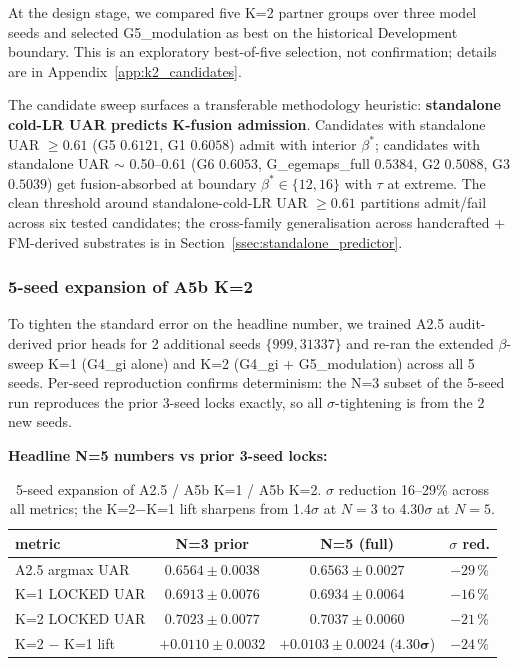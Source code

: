 At the design stage, we compared five K=2 partner groups over three model seeds and selected G5\_modulation as best on the historical Development boundary. This is an exploratory best-of-five selection, not confirmation; details are in Appendix~\ref{app:k2_candidates}.

The candidate sweep surfaces a transferable methodology heuristic: \textbf{standalone cold-LR UAR predicts K-fusion admission}. Candidates with standalone UAR $\geq 0.61$ (G5 $0.6121$, G1 $0.6058$) admit with interior $\beta^*$; candidates with standalone UAR $\sim$ 0.50--0.61 (G6 $0.6053$, G\_egemaps\_full $0.5384$, G2 $0.5088$, G3 $0.5039$) get fusion-absorbed at boundary $\beta^* \in \{12, 16\}$ with $\tau$ at extreme. The clean threshold around standalone-cold-LR UAR $\geq 0.61$ partitions admit/fail across six tested candidates; the cross-family generalisation across handcrafted + FM-derived substrates is in Section~\ref{ssec:standalone_predictor}.

\subsubsection{5-seed expansion of A5b K=2}
\label{ssec:k2_5seed}

To tighten the standard error on the headline number, we trained A2.5 audit-derived prior heads for 2 additional seeds $\{999, 31337\}$ and re-ran the extended $\beta$-sweep K=1 (G4\_gi alone) and K=2 (G4\_gi + G5\_modulation) across all 5 seeds. Per-seed reproduction confirms determinism: the N=3 subset of the 5-seed run reproduces the prior 3-seed locks exactly, so all $\sigma$-tightening is from the 2 new seeds.

\textbf{Headline N=5 numbers vs prior 3-seed locks:}

\begin{table}[t]
\centering\small
\caption{5-seed expansion of A2.5 / A5b K=1 / A5b K=2. $\sigma$ reduction 16--29\% across all metrics; the K=2$-$K=1 lift sharpens from 1.4$\sigma$ at $N{=}3$ to 4.30$\sigma$ at $N{=}5$.}
\label{tab:5seed}
\begin{tabular}{lccc}
\toprule
metric              & N=3 prior        & N=5 (full)        & $\sigma$ red. \\
\midrule
A2.5 argmax UAR     & $0.6564 \pm 0.0038$ & $0.6563 \pm 0.0027$ & $-29\,\%$ \\
K=1 LOCKED UAR      & $0.6913 \pm 0.0076$ & $0.6934 \pm 0.0064$ & $-16\,\%$ \\
K=2 LOCKED UAR      & $0.7023 \pm 0.0077$ & $\mathbf{0.7037 \pm 0.0060}$ & $-21\,\%$ \\
K=2 $-$ K=1 lift    & $+0.0110 \pm 0.0032$ & $+0.0103 \pm 0.0024$ ($\mathbf{4.30\sigma}$) & $-24\,\%$ \\
\bottomrule
\end{tabular}
\end{table}

